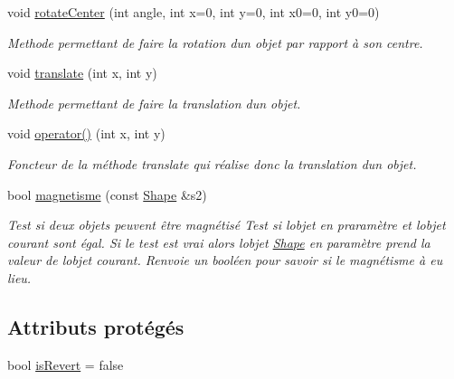\begin{DoxyCompactItemize}
void \hyperlink{classgeometric_shape_1_1_shape_a2c958faaa126d4190304be1acf3328b9}{rotate\+Center} (int angle, int x=0, int y=0, int x0=0, int y0=0)
\begin{DoxyCompactList}\small\item\em Methode permettant de faire la rotation d\textquotesingle{}un objet par rapport à son centre. \end{DoxyCompactList}\item 
void \hyperlink{classgeometric_shape_1_1_shape_a30aff4a795bcfff9f65353cf79d0376f}{translate} (int x, int y)
\begin{DoxyCompactList}\small\item\em Methode permettant de faire la translation d\textquotesingle{}un objet. \end{DoxyCompactList}\item 
void \hyperlink{classgeometric_shape_1_1_shape_a4b52ac575add3225201f29d5b81647f8}{operator()} (int x, int y)
\begin{DoxyCompactList}\small\item\em Foncteur de la méthode translate qui réalise donc la translation d\textquotesingle{}un objet. \end{DoxyCompactList}\item 
bool \hyperlink{classgeometric_shape_1_1_shape_af2882c1c1968a92bdccd568f08a9c1d1}{magnetisme} (const \hyperlink{classgeometric_shape_1_1_shape}{Shape} \&s2)
\begin{DoxyCompactList}\small\item\em Test si deux objets peuvent être magnétisé Test si l\textquotesingle{}objet en praramètre et l\textquotesingle{}objet courant sont égal. Si le test est vrai alors l\textquotesingle{}objet \hyperlink{classgeometric_shape_1_1_shape}{Shape} en paramètre prend la valeur de l\textquotesingle{}objet courant. Renvoie un booléen pour savoir si le magnétisme à eu lieu. \end{DoxyCompactList}\end{DoxyCompactItemize}
\subsection*{Attributs protégés}
\begin{DoxyCompactItemize}
\item 
bool \hyperlink{classgeometric_shape_1_1_shape_a34812f582bdf0a89b0d7e9a0b86dddbf}{is\+Revert} = false
\end{DoxyCompactItemize}
